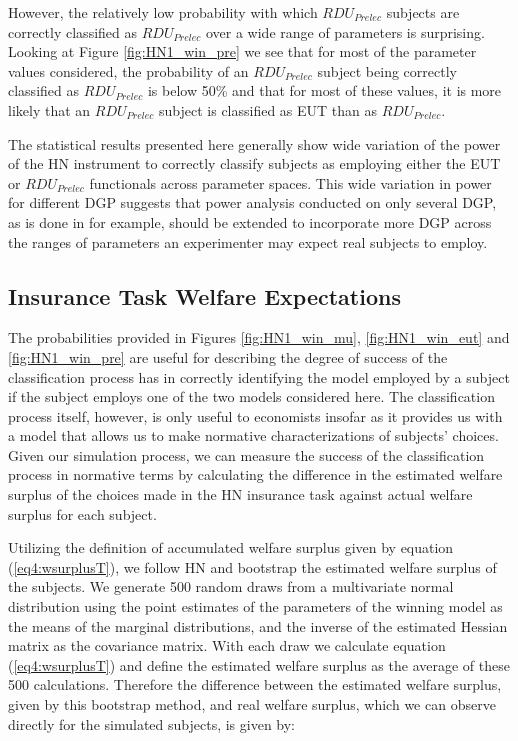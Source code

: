 \documentclass[../main.tex]{subfiles}
\begin{document}
However, the relatively low probability with which $\mathit{RDU_{Prelec}}$ subjects are correctly classified as $\mathit{RDU_{Prelec}}$ over a wide range of parameters is surprising.
Looking at Figure \ref{fig:HN1_win_pre} we see that for most of the parameter values considered, the probability of an $\mathit{RDU_{Prelec}}$ subject being correctly classified as $\mathit{RDU_{Prelec}}$ is below 50\% and that for most of these values, it is more likely that an $\mathit{RDU_{Prelec}}$ subject is classified as EUT than as $\mathit{RDU_{Prelec}}$.

The statistical results presented here generally show wide variation of the power of the HN instrument to correctly classify subjects as employing either the EUT or $\mathit{RDU_{Prelec}}$ functionals across parameter spaces.
This wide variation in power for different DGP suggests that power analysis conducted on only several DGP, as is done in \textcite{Wilcox2015} for example, should be extended to incorporate more DGP across the ranges of parameters an experimenter may expect real subjects to employ.

\subsection{\texorpdfstring{\textcite{Harrison2016}}{Harrison and Ng (2016)} Insurance Task Welfare Expectations}
\label{sec4:WT}

The probabilities provided in Figures \ref{fig:HN1_win_mu}, \ref{fig:HN1_win_eut} and \ref{fig:HN1_win_pre} are useful for describing the degree of success of the classification process has in correctly identifying the model employed by a subject if the subject employs one of the two models considered here.
The classification process itself, however, is only useful to economists insofar as it provides us with a model that allows us to make normative characterizations of subjects' choices.
Given our simulation process, we can measure the success of the classification process in normative terms by calculating the difference in the estimated welfare surplus of the choices made in the HN insurance task against actual welfare surplus for each subject.

Utilizing the definition of accumulated welfare surplus given by equation (\ref{eq4:wsurplusT}), we follow HN \parencite*[110-111]{Harrison2016} and bootstrap the estimated welfare surplus of the subjects.
We generate 500 random draws from a multivariate normal distribution using the point estimates of the parameters of the winning model as the means of the marginal distributions, and the inverse of the estimated Hessian matrix as the covariance matrix.{\footnotemark}
With each draw we calculate equation (\ref{eq4:wsurplusT}) and define the estimated welfare surplus as the average of these 500 calculations.
Therefore the difference between the estimated welfare surplus, given by this bootstrap method, and real welfare surplus, which we can observe directly for the simulated subjects, is given by:
\end{document}
